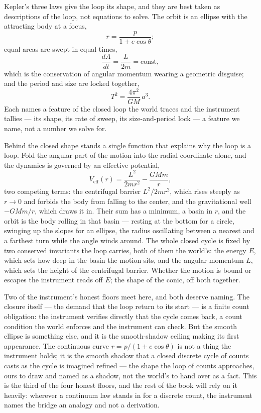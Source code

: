 Kepler's three laws give the loop its shape, and they are best taken as descriptions of the loop, not
equations to solve. The orbit is an ellipse with the attracting body at a focus,
\begin{equation}
  r = \frac{p}{1 + e\cos\theta};
\end{equation}
equal areas are swept in equal times,
\begin{equation}
  \frac{dA}{dt} = \frac{L}{2m} = \text{const},
\end{equation}
which is the conservation of angular momentum wearing a geometric disguise; and the period and size are
locked together,
\begin{equation}
  T^2 = \frac{4\pi^2}{GM}\,a^3 .
\end{equation}
Each names a feature of the closed loop the world traces and the instrument tallies --- its shape, its rate of
sweep, its size-and-period lock --- a feature we name, not a number we solve for.

Behind the closed shape stands a single function that explains why the loop is a loop. Fold the angular part
of the motion into the radial coordinate alone, and the dynamics is governed by an effective potential,
\begin{equation}
  V_{\text{eff}}(r) = \frac{L^2}{2mr^2} - \frac{GMm}{r},
\end{equation}
two competing terms: the centrifugal barrier $L^2/2mr^2$, which rises steeply as $r \to 0$ and forbids the
body from falling to the center, and the gravitational well $-GMm/r$, which draws it in. Their sum has a
minimum, a basin in $r$, and the orbit is the body rolling in that basin --- resting at the bottom for a
circle, swinging up the slopes for an ellipse, the radius oscillating between a nearest and a farthest turn
while the angle winds around. The whole closed cycle is fixed by two conserved invariants the loop carries, both of them the world's:
the energy $E$, which sets how deep in the basin the motion sits, and the angular momentum $L$, which sets the
height of the centrifugal barrier. Whether the motion is bound or escapes the instrument reads off $E$; the
shape of the conic, off both together.

Two of the instrument's honest floors meet here, and both deserve naming. The closure itself --- the demand
that the loop return to its start --- is a finite count obligation: the instrument verifies directly that the
cycle comes back, a count condition the world enforces and the instrument can check. But the smooth ellipse is
something else, and it is the smooth-shadow ceiling making its first appearance. The continuous curve $r =
p/(1+e\cos\theta)$ is not a thing the instrument holds; it is the smooth shadow that a closed discrete cycle of
counts casts as the cycle is imagined refined --- the shape the loop of counts approaches, ours to draw and
named as a shadow, not the world's to hand over as a fact.
This is the third of the four honest floors, and the rest of the book will rely on it heavily: wherever a
continuum law stands in for a discrete count, the instrument names the bridge an analogy and not a
derivation.

